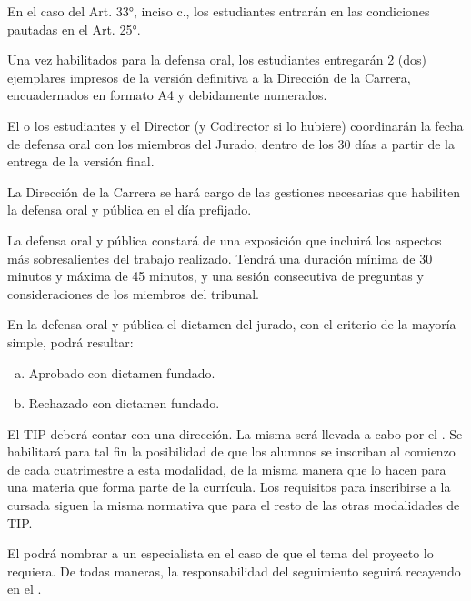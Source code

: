 \articulo En el caso del Art. 33°, inciso c., los estudiantes entrarán en las
condiciones pautadas en el Art. 25°. 


\articulo Una vez habilitados para la defensa oral, los estudiantes
entregarán 2 (dos) ejemplares impresos de la versión definitiva a la Dirección de la
Carrera, encuadernados en formato A4 y debidamente numerados.

\articulo El o los estudiantes y el Director (y Codirector si lo hubiere)
coordinarán la fecha de defensa oral con los miembros del Jurado, dentro de los 30
días a partir de la entrega de la versión final.

\articulo La Dirección de la Carrera se hará cargo de las gestiones
necesarias que habiliten la defensa oral y pública en el día prefijado.

\articulo La defensa oral y pública constará de una exposición que incluirá
los aspectos más sobresalientes del trabajo realizado. Tendrá una duración mínima de
30 minutos y máxima de 45 minutos, y una sesión consecutiva de preguntas y
consideraciones de los miembros del tribunal.

\articulo En la defensa oral y pública el dictamen del jurado, con el criterio
de la mayoría simple, podrá resultar: 
\begin{enumerate}[a.]
\item Aprobado con dictamen fundado.
\item Rechazado con dictamen fundado.
\end{enumerate}




\articulo El TIP deberá contar con una dirección. La misma será llevada a
cabo por el \profesorTIP{}. Se habilitará para tal fin la posibilidad de que los alumnos 
se inscriban al comienzo de cada cuatrimestre a esta modalidad, de la misma manera que lo 
hacen para una materia que forma parte de la currícula. Los requisitos para inscribirse a 
la cursada siguen la misma normativa que para el resto de las otras modalidades de TIP.

\articulo El \profesorTIP{}  podrá nombrar a un especialista en el caso de que el
tema del proyecto lo requiera. De todas maneras, la responsabilidad del seguimiento seguirá recayendo
en el \profesorTIP{}.

